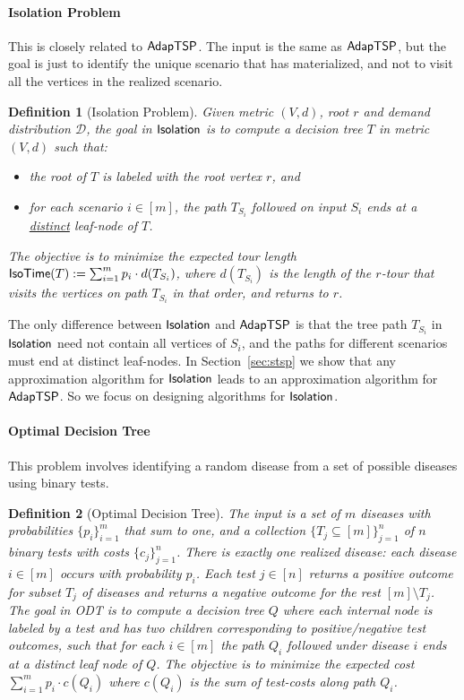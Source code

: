 \documentclass[11pt]{article}
\newtheorem{definition}{Definition}
\def\sse{\subseteq}
\def\ds{\mathcal{D}}
\def\odt{{\sf ODT}\xspace}
\def\isoprob{\ensuremath{{\sf Isolation}}\xspace}
\def\isotime{\ensuremath{{\sf IsoTime}}}
\def\stsp{\ensuremath{{\sf AdapTSP}}\xspace}
\begin{document}
\paragraph{Isolation Problem}
This is closely related to \stsp. The input is  the same as \stsp, but the goal
is just to identify the unique scenario that 
has materialized, and not to visit all the vertices in the realized scenario.
\smallskip
\begin{definition}[Isolation Problem]\label{def:iso}
Given metric $(V,d)$, root $r$ and demand distribution $\ds$, the goal in \isoprob is to compute a decision tree $T$ in
metric $(V,d)$ such that:
  \begin{itemize}
  \item the root of $T$ is labeled with the root vertex $r$, and
  \item for each scenario $i\in[m]$, the path $T_{S_i}$ followed on input $S_i$ ends at a \underline{distinct} leaf-node of $T$.
    \end{itemize}
The objective  is to
  minimize the expected tour length $\isotime(T):=\sum_{i=1}^m p_i \cdot
  d(T_{S_i})$, where $d(T_{S_i})$ is the length of the $r$-tour that visits the vertices on path $T_{S_i}$ in that order, and returns to $r$.
\end{definition}
\smallskip

The only difference between \isoprob and \stsp is that the tree path $T_{S_i}$ in \isoprob need not contain
all vertices of $S_i$, and the paths for different scenarios must  end at distinct leaf-nodes. In Section~\ref{sec:stsp} we show that  any approximation algorithm for \isoprob leads to an approximation algorithm for \stsp. So we focus on designing algorithms for \isoprob. 




\paragraph{Optimal Decision Tree} This problem involves identifying a random disease from a set of possible diseases using binary tests.  

\smallskip
\begin{definition}[Optimal Decision Tree]\label{def:odt}
The input is a set of $m$ diseases with 
probabilities $\{p_i\}_{i=1}^m$ that sum to one, and a collection $\{T_j\sse[m]\}_{j=1}^n$ of $n$ binary tests with
 costs $\{c_j\}_{j=1}^n$. There is exactly one realized disease: each disease $i\in[m]$ occurs with probability $p_i$. Each test $j\in [n]$ returns a positive outcome for subset $T_j$ of  diseases and returns a negative outcome for the rest $[m]\setminus T_j$. The goal in \odt is to compute a decision tree $Q$ where each internal node is  labeled by a test and has two children corresponding to  positive/negative test outcomes, such that for each $i\in[m]$ the path $Q_i$ followed under disease $i$ ends at a distinct leaf node of $Q$. The objective is to minimize the expected cost $\sum_{i=1}^m p_i\cdot c(Q_i)$ where $c(Q_i)$ is the sum of test-costs along path $Q_i$.
\end{definition}
\smallskip
\end{document}

